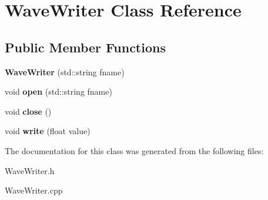 \hypertarget{classWaveWriter}{}\section{Wave\+Writer Class Reference}
\label{classWaveWriter}
\subsection*{Public Member Functions}
\begin{DoxyCompactItemize}
\item 
{\bfseries Wave\+Writer} (std\+::string fname)\hypertarget{classWaveWriter_ab56ef6702c7c651004329fe76893b2f7}{}\label{classWaveWriter_ab56ef6702c7c651004329fe76893b2f7}

\item 
void {\bfseries open} (std\+::string fname)\hypertarget{classWaveWriter_a369569d5d2068f497731936073ad4ad1}{}\label{classWaveWriter_a369569d5d2068f497731936073ad4ad1}

\item 
void {\bfseries close} ()\hypertarget{classWaveWriter_ae50259472af637a4083399953440ee0e}{}\label{classWaveWriter_ae50259472af637a4083399953440ee0e}

\item 
void {\bfseries write} (float value)\hypertarget{classWaveWriter_a267d0704f57004f0adf079096d3dc460}{}\label{classWaveWriter_a267d0704f57004f0adf079096d3dc460}

\end{DoxyCompactItemize}


The documentation for this class was generated from the following files\+:\begin{DoxyCompactItemize}
\item 
Wave\+Writer.\+h\item 
Wave\+Writer.\+cpp\end{DoxyCompactItemize}
